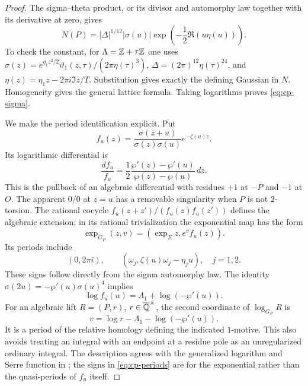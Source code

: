 \begin{proof}
The sigma--theta product, or its divisor and automorphy law
together with its derivative at zero, gives
\begin{equation}\label{eq:cp-klein}
 N(P)=|\Delta|^{1/12}|\sigma(u)|
                   \exp\!\left(-\frac12\Re(u\eta(u))\right).
\end{equation}
To check the constant, for $\Lambda=\mathbb Z+\tau\mathbb Z$ one uses
$\sigma(z)=e^{\eta_1z^2/2}\vartheta_1(z,\tau)/(2\pi\eta(\tau)^3)$,
$\Delta=(2\pi)^{12}\eta(\tau)^{24}$, and
$\eta(z)=\eta_1z-2\pi i\Im z/T$. Substitution gives exactly
the defining Gaussian in $N$. Homogeneity gives the general
lattice formula. Taking logarithms proves \eqref{eq:cp-sigma}.

We make the period identification explicit. Put
\[
 f_u(z)=\frac{\sigma(z+u)}{\sigma(z)\sigma(u)}e^{-\zeta(u)z}.
\]
Its logarithmic differential is
\[
 \frac{df_u}{f_u}
 =\frac12\frac{\wp'(z)-\wp'(u)}{\wp(z)-\wp(u)}\,dz.
\]
This is the pullback of an algebraic differential with residues
$+1$ at $-P$ and $-1$ at $O$. The apparent $0/0$ at $z=u$
has a removable singularity when $P$ is not $2$-torsion.
The rational cocycle $f_u(z+z')/(f_u(z)f_u(z'))$ defines
the algebraic extension; in its rational trivialization the
exponential map has the form
\[
 \exp_{G_P}(z,v)=(\exp_E z,e^v f_u(z)).
\]
Its periods include
\begin{equation}\label{eq:cp-periods}
 (0,2\pi i),\qquad
 (\omega_j,\zeta(u)\omega_j-\eta_j u),\quad j=1,2.
\end{equation}
These signs follow directly from the sigma automorphy law.
The identity
$\sigma(2u)=-\wp'(u)\sigma(u)^4$ implies
\[
 \log f_u(u)=\Lambda_1+\log(-\wp'(u)).
\]
For an algebraic lift $R=(P,r)$, $r\in\overline{\mathbb Q}^{\times}$,
the second coordinate of $\log_{G_P}R$ is
\begin{equation}\label{eq:cp-v}
 v=\log r-\Lambda_1-\log(-\wp'(u)).
\end{equation}
It is a period of the relative homology defining the indicated
$1$-motive. This also avoids treating an integral with an endpoint
at a residue pole as an unregularized ordinary integral.
The description agrees with the generalized logarithm and
Serre function in \citet[Definitions 2.3--2.4 and
Section 6]{bertolin2022}; the signs in
\eqref{eq:cp-periods} are for the exponential rather than the
quasi-periods of $f_u$ itself.
\end{proof}

